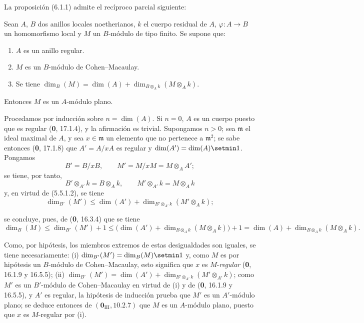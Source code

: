 La proposición (6.1.1) admite el recíproco parcial siguiente:

\begin{proposition}[6.1.5]
Sean $A$, $B$ dos anillos locales noetherianos, $k$ el cuerpo residual de
$A$, $\varphi:A\to B$ un homomorfismo local y $M$ un $B$-módulo de tipo finito.
Se supone que:
\begin{enumerate}
\item[\textup{1\textsuperscript{o}}] $A$ es un anillo regular.
\item[\textup{2\textsuperscript{o}}] $M$ es un $B$-módulo de Cohen--Macaulay.
\item[\textup{3\textsuperscript{o}}] Se tiene
$\dim_B(M)=\dim(A)+\dim_{B\otimes_Ak}(M\otimes_Ak)$.
\end{enumerate}
Entonces $M$ es un $A$-módulo plano.
\end{proposition}

Procedamos por inducción sobre $n=\dim(A)$. Si $n=0$, $A$ es un cuerpo
puesto que es regular (\textbf 0, 17.1.4), y la afirmación es trivial. Supongamos
$n>0$; sea $\mathfrak m$ el ideal maximal de $A$, y sea
$x\in\mathfrak m$ un elemento que no pertenece a $\mathfrak m^2$; se sabe
entonces (\textbf 0, 17.1.8) que $A'=A/xA$ es regular y
$\dim(A')=\dim(A)\setmin 1$. Pongamos
\[
B'=B/xB,\qquad M'=M/xM=M\otimes_AA';
\]
se tiene, por tanto,
\[
B'\otimes_{A'}k=B\otimes_Ak,\qquad
M'\otimes_{A'}k=M\otimes_Ak
\]
y, en virtud de (5.5.1.2), se tiene
\[
\dim_{B'}(M')\leq\dim(A')+
\dim_{B'\otimes_{A'}k}(M'\otimes_Ak);
\]


se concluye, pues, de (\textbf 0, 16.3.4) que se tiene
\[
\dim_B(M)\leq\dim_{B'}(M')+1
\leq\bigl(\dim(A')+
\dim_{B\otimes_Ak}(M\otimes_Ak)\bigr)+1
=\dim(A)+\dim_{B\otimes_Ak}(M\otimes_Ak).
\]

Como, por hipótesis, los miembros extremos de estas desigualdades son iguales,
se tiene necesariamente: (i) $\dim_{B'}(M')=\dim_B(M)\setmin 1$ y, como $M$ es por
hipótesis un $B$-módulo de Cohen--Macaulay, esto significa que $x$ es
$M$-\emph{regular} (\textbf 0, 16.1.9 y 16.5.5); (ii)
$\dim_{B'}(M')=\dim(A')+
\dim_{B'\otimes_{A'}k}(M'\otimes_{A'}k)$; como $M'$ es un $B'$-módulo de
Cohen--Macaulay en virtud de (i) y de (\textbf 0, 16.1.9 y 16.5.5), y $A'$ es regular,
la hipótesis de inducción prueba que $M'$ es un $A'$-módulo plano; se deduce
entonces de $(\mathbf{0}_{\mathrm{III}}, 10.2.7)$ que $M$ es un $A$-módulo plano,
puesto que $x$ es $M$-regular por (i).
